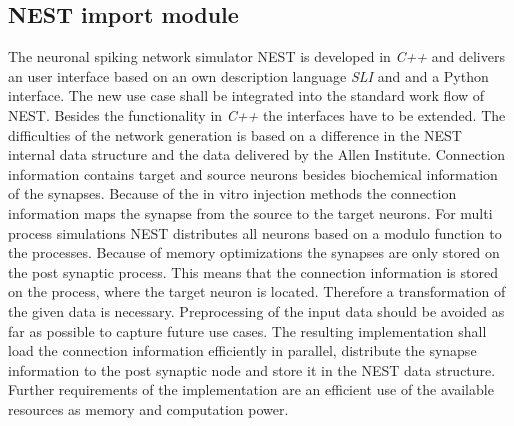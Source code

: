\documentclass[a4paper]{article}
\begin{document}
\subsection{NEST import module}

The neuronal spiking network simulator NEST is developed in \emph{C++} and delivers
an user interface based on an own description language \emph{SLI} and  and a Python interface.
The new use case shall be integrated into the standard work flow of NEST.
Besides the functionality in \emph{C++} the interfaces have to be extended.
The difficulties of the network generation is based on a difference in 
the NEST internal data structure and the data delivered by the Allen Institute.
Connection information contains target and source neurons besides biochemical
information of the synapses. Because of the in vitro injection methods the
connection information maps the synapse from the source to the target neurons.
For multi process simulations NEST distributes all neurons based on a modulo function 
to the processes. Because of memory optimizations the synapses are only stored on the
post synaptic process. This means that the connection information is stored
on the process, where the target neuron is located. Therefore a transformation of the given data is
necessary. Preprocessing of the input data should be avoided as far as possible to capture
future use cases.
The resulting implementation shall load the connection information efficiently in parallel,
distribute the synapse information to the post synaptic node and store it in
the NEST data structure.
Further requirements of the implementation are an efficient use of the available resources as
memory and computation power. 
\end{document}
